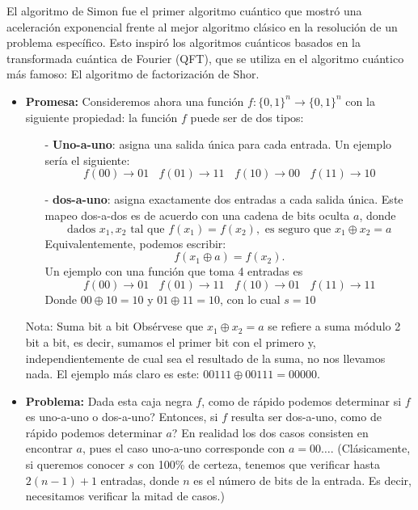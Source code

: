 \documentclass[a4paper,11pt]{book} %
\numberwithin{equation}{chapter}
\begin{document}
El algoritmo de Simon fue el primer algoritmo cuántico que mostró una aceleración exponencial frente al mejor algoritmo clásico en la resolución de un problema específico. Esto inspiró los algoritmos cuánticos basados en la transformada cuántica de Fourier (QFT), que se utiliza en el algoritmo cuántico más famoso: El algoritmo de factorización de Shor.


\begin{itemize}
	\item \textbf{Promesa:} Consideremos ahora una función $f:\{0,1\}^n \to \{0,1\}^n$ con la siguiente propiedad: la función $f$ puede ser de dos tipos:
	\begin{itemize}
		\item[-] \textbf{Uno-a-uno}: asigna una salida única para cada entrada. Un ejemplo sería el siguiente:
		\begin{equation}
		f(00) \rightarrow 01 ~~~~
		f(01) \rightarrow 11 ~~~~
		f(10) \rightarrow 00 ~~~~
		f(11) \rightarrow 10 
		\end{equation}
		\item[-] \textbf{dos-a-uno}: asigna exactamente dos entradas a cada salida única. Este mapeo dos-a-dos es de acuerdo con una cadena de bits oculta $a$, donde
		\begin{equation}
		\text{dados } x_1, x_2 \text{ tal que } f(x_1) = f(x_2), \text{ es seguro que } x_1 \oplus x_2 = a
		\end{equation}
		Equivalentemente, podemos escribir: 
		\begin{equation} 
		f(x_1 \oplus a ) = f(x_2).
		\end{equation}
		Un ejemplo con una función que toma 4 entradas es
		\begin{equation}
		f(00) \rightarrow 01 ~~~~
		f(01) \rightarrow 11 ~~~~
		f(10) \rightarrow 01 ~~~~
		f(11) \rightarrow 11 
		\end{equation}
		Donde $00 \oplus 10 =  10$ y $01 \oplus 11 = 10$, con lo cual $s =10$
	\end{itemize}
	
	\begin{mybox_blue}{Nota: Suma bit a bit}
	Obsérvese que $x_1 \oplus x_2 = a$ se refiere a suma módulo 2 bit a bit, es decir, sumamos el primer bit con el primero y, independientemente de cual sea el resultado de la suma, no nos llevamos nada. El ejemplo más claro es este: $00111 \oplus 00111 = 00000$.
	\end{mybox_blue}
	
	\item \textbf{Problema:} Dada esta caja negra $f$, como de rápido podemos determinar si $f$ es uno-a-uno o dos-a-uno? Entonces, si $f$ resulta ser dos-a-uno, como de rápido podemos determinar $a$? En realidad los dos casos consisten en encontrar $a$, pues el caso uno-a-uno corresponde con $a=00\dots$. (Clásicamente, si queremos conocer $s$ con 100\% de certeza, tenemos que verificar hasta $2(n-1) +1$ entradas, donde $n$ es el número de bits de la entrada. Es decir, necesitamos verificar la mitad de casos.)
		

\end{itemize}
\end{document}
